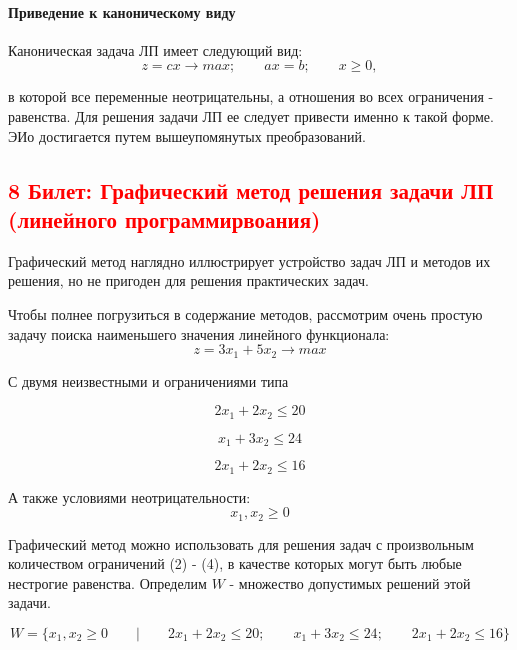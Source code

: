\documentclass[14pt, letterpaper]{article}
\begin{document}
\paragraph{Приведение к каноническому виду}

Каноническая задача ЛП имеет следующий вид:
$$z = cx \rightarrow max;\qquad ax = b;\qquad x \geq 0,$$

в которой все переменные неотрицательны, а отношения во всех ограничения - равенства. Для решения задачи ЛП ее следует привести именно к такой форме. ЭИо достигается путем вышеупомянутых преобразований.


\newpage
\subsection{\textcolor{red}{8 Билет: Графический метод решения задачи ЛП (линейного программирвоания)}}


    Графический метод наглядно иллюстрирует устройство задач ЛП и методов их решения, но не пригоден для решения практических задач.

Чтобы полнее погрузиться в содержание методов, рассмотрим очень простую задачу поиска наименьшего значения линейного функционала:
\begin{equation}
    z = 3x_{1} + 5x_{2} \rightarrow max
\end{equation}
    
С двумя неизвестными и ограничениями типа \leq

\begin{equation}
    2x_{1} + 2x_{2} \leq 20
\end{equation}

\begin{equation}
    x_{1} + 3x_{2} \leq 24 
\end{equation}

\begin{equation}
    2x_{1} + 2x_{2} \leq 16
\end{equation}

А также условиями неотрицательности:
\begin{equation}
    x_{1},x_{2} \geq 0
\end{equation}



Графический метод можно использовать для решения задач с произвольным количеством ограничений (2) - (4), в качестве которых могут быть любые нестрогие равенства. Определим $W$ - множество допустимых решений этой задачи.

$$ W = \{ x_{1},x_{2} \geq 0 \qquad | \qquad  2x_{1} + 2x_{2} \leq  20;\qquad  x_{1} + 3x_{2}  \leq 24;\qquad  2x_{1} + 2x_{2} \leq 16 \}  $$
\end{document}
